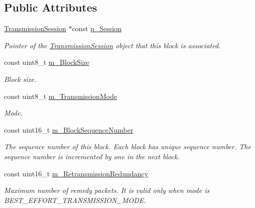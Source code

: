 \subsection*{Public Attributes}
\begin{DoxyCompactItemize}
\item 
\hyperlink{class_network_coding_1_1_transmission_session}{Transmission\+Session} $\ast$const \hyperlink{class_network_coding_1_1_transmission_block_ae45d8369907e22b369bc8d0a0d93d378}{p\+\_\+\+Session}\hypertarget{class_network_coding_1_1_transmission_block_ae45d8369907e22b369bc8d0a0d93d378}{}\label{class_network_coding_1_1_transmission_block_ae45d8369907e22b369bc8d0a0d93d378}

\begin{DoxyCompactList}\small\item\em Pointer of the \hyperlink{class_network_coding_1_1_transmission_session}{Transmission\+Session} object that this block is associated. \end{DoxyCompactList}\item 
const uint8\+\_\+t \hyperlink{class_network_coding_1_1_transmission_block_a3fac24ea69bc7f68f297d72f0b3e0448}{m\+\_\+\+Block\+Size}
\begin{DoxyCompactList}\small\item\em Block size. \end{DoxyCompactList}\item 
const uint8\+\_\+t \hyperlink{class_network_coding_1_1_transmission_block_a82c18d348f0a5660240e47ee9c9880b1}{m\+\_\+\+Transmission\+Mode}
\begin{DoxyCompactList}\small\item\em Mode. \end{DoxyCompactList}\item 
const uint16\+\_\+t \hyperlink{class_network_coding_1_1_transmission_block_a54d1c096df401da6ca57636c91b3faca}{m\+\_\+\+Block\+Sequence\+Number}
\begin{DoxyCompactList}\small\item\em The sequence number of this block. Each block has unique sequence number. The sequence number is incremented by one in the next block. \end{DoxyCompactList}\item 
const uint16\+\_\+t \hyperlink{class_network_coding_1_1_transmission_block_a1dc8966af67de1e8309b62e3f87854f2}{m\+\_\+\+Retransmission\+Redundancy}
\begin{DoxyCompactList}\small\item\em Maximum number of remedy packets. It is valid only when mode is B\+E\+S\+T\+\_\+\+E\+F\+F\+O\+R\+T\+\_\+\+T\+R\+A\+N\+S\+M\+I\+S\+S\+I\+O\+N\+\_\+\+M\+O\+DE. \end{DoxyCompactList}\item 

\end{DoxyCompactItemize}
